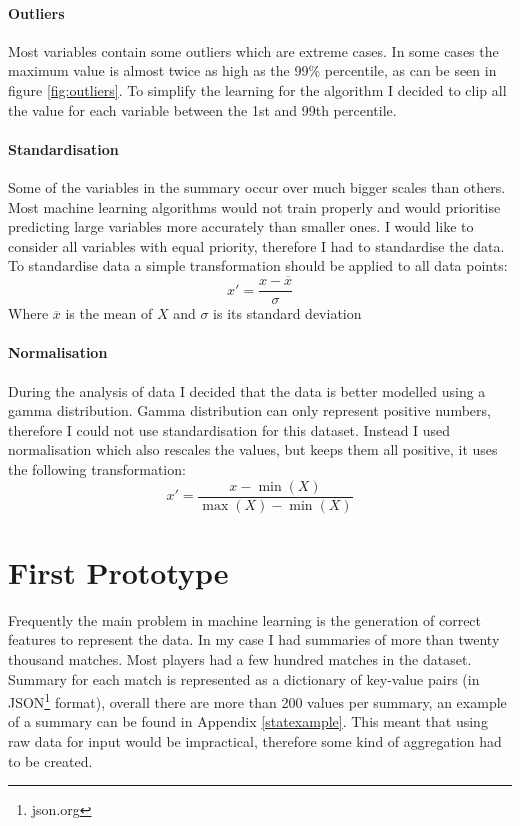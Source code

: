 \documentclass[12pt,a4paper]{book}
\newcommand\mean[1]{\overline{#1}}
\begin{document}
\paragraph{Outliers}
Most variables contain some outliers which are extreme cases.
In some cases the maximum value is almost twice as high as the 99\% percentile, as can be seen in figure \ref{fig:outliers}.
To simplify the learning for the algorithm I decided to clip all the value for each variable between the 1st and 99th percentile.
\paragraph{Standardisation}
Some of the variables in the summary occur over much bigger scales than others.
Most machine learning algorithms would not train properly and would prioritise predicting large variables more accurately than smaller ones.
I would like to consider all variables with equal priority, therefore I had to standardise the data.
To standardise data a simple transformation should be applied to all data points:
\begin{equation*}
x' = \frac{x - \mean{x}}{\sigma}
\end{equation*}
Where $\mean{x}$ is the mean of $X$ and $\sigma$ is its standard deviation
\paragraph{Normalisation}
During the analysis of data I decided that the data is better modelled using a gamma distribution.
Gamma distribution can only represent positive numbers, therefore I could not use standardisation for this dataset.
Instead I used normalisation which also rescales the values, but keeps them all positive, it uses the following transformation:
\begin{equation*}
x' = \frac{x - \min(X)}{\max(X)-\min(X)}
\end{equation*}
\section{First Prototype}
Frequently the main problem in machine learning is the generation of correct features to represent the data.
In my case I had summaries of more than twenty thousand matches.
Most players had a few hundred matches in the dataset.
Summary for each match is represented as a dictionary of key-value pairs (in JSON\footnote{json.org} format), overall there are more than 200 values per summary, an example of a summary can be found in Appendix \ref{statexample}.
This meant that using raw data for input would be impractical, therefore some kind of aggregation had to be created.
\end{document}
